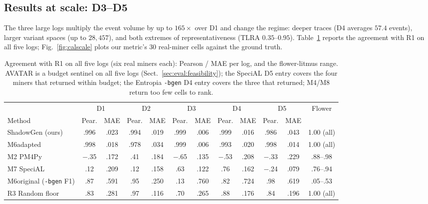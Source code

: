 \documentclass[runningheads]{llncs}
\newcommand{\chg}[1]{\textcolor{chgblue}{#1}}
\begin{document}
{\color{chgblue}
\subsection{Results at scale: D3--D5}
\label{sec:eval:scale}
The three large logs multiply the event volume by up to $165\times$ over D1 and change the regime: deeper traces (D4 averages $57.4$ events), larger variant spaces (up to $28{,}457$), and both extremes of representativeness (TLRA $0.35$--$0.95$). Table~\ref{tab:scale} reports the agreement with R1 on all five logs; Fig.~\ref{fig:calscale} plots our metric's 30 real-miner cells against the ground truth.

\begin{table}[t]
\centering
\caption{Agreement with R1 on all five logs (six real miners each): Pearson / MAE per log, and the flower-litmus range. \chg{AVATAR is a budget sentinel on all five logs (Sect.~\ref{sec:eval:feasibility});} the SpeciAL D5 entry covers the four miners that returned within budget; \chg{the Entropia \texttt{-bgen} D4 entry covers the three that returned;} M4/M8 return too few cells to rank.}
\label{tab:scale}
\setlength{\tabcolsep}{2.2pt}
\scriptsize
\begin{tabular}{@{}l cc cc cc cc cc c@{}}
\toprule
 & \multicolumn{2}{c}{D1} & \multicolumn{2}{c}{D2} & \multicolumn{2}{c}{D3} & \multicolumn{2}{c}{D4} & \multicolumn{2}{c}{D5} & Flower \\
\cmidrule(lr){2-3}\cmidrule(lr){4-5}\cmidrule(lr){6-7}\cmidrule(lr){8-9}\cmidrule(lr){10-11}
Method & Pear. & MAE & Pear. & MAE & Pear. & MAE & Pear. & MAE & Pear. & MAE & \\
\midrule
ShadowGen (ours) & .996 & .023 & .994 & .019 & .999 & .006 & .999 & .016 & .986 & .043 & 1.00 (all) \\
M6adapted & .998 & .018 & .978 & .034 & .999 & .006 & .993 & .020 & .998 & .014 & 1.00 (all) \\
M2 PM4Py & $-$.35 & .172 & .41 & .184 & $-$.65 & .135 & $-$.53 & .208 & $-$.33 & .229 & .88--.98 \\
M7 SpeciAL & .12 & .209 & .12 & .158 & .63 & .122 & .76 & .162 & $-$.24 & .079 & .76--.94 \\
M6original (\texttt{-bgen} F1) & .87 & .591 & .95 & .250 & .13 & .760 & .82 & .724 & .98 & .619 & .05--.53 \\
R3 Random floor & .83 & .281 & .97 & .116 & .70 & .265 & .88 & .176 & .84 & .196 & 1.00 (all) \\
\bottomrule
\end{tabular}
\end{table}

}
\end{document}
